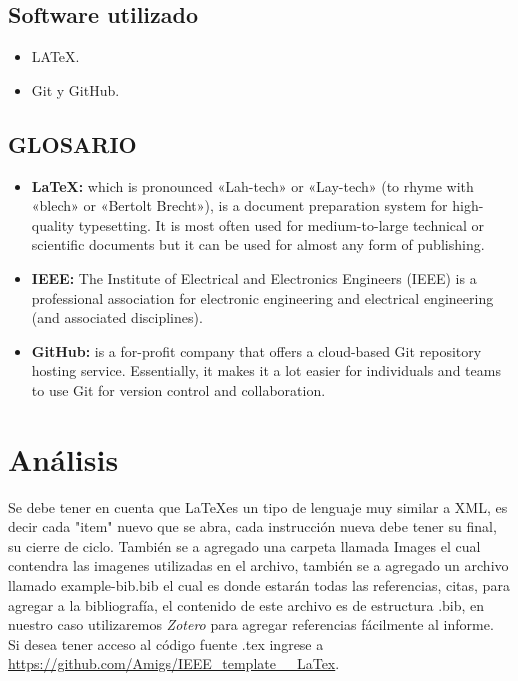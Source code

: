 \documentclass[journal, spanish]{IEEEtran}
\begin{document}
\subsection{\bf Software utilizado}
\begin{itemize}
    \item LATeX.
    \item Git y GitHub.
\end{itemize}
\subsection{\bf GLOSARIO}
\begin{itemize}
    \item {\bf LaTeX:} which is pronounced «Lah-tech» or «Lay-tech» (to rhyme with «blech» or «Bertolt Brecht»), is a document preparation system for high-quality typesetting. It is most often used for medium-to-large technical or scientific documents but it can be used for almost any form of publishing.\cite{noauthor_introduction_nodate}
    \item {\bf IEEE:} The Institute of Electrical and Electronics Engineers (IEEE) is a professional association for electronic engineering and electrical engineering (and associated disciplines).\cite{noauthor_institute_2021}
    \item {\bf GitHub:} is a for-profit company that offers a cloud-based Git repository hosting service. Essentially, it makes it a lot easier for individuals and teams to use Git for version control and collaboration.\cite{noauthor_what_nodate}
\end{itemize}
\section{Análisis}
Se debe tener en cuenta que \LaTeX es un tipo de lenguaje muy similar a XML, es decir cada "item" nuevo que se abra, cada instrucción nueva debe tener su final, su cierre de ciclo. También se a agregado una carpeta llamada Images el cual contendra las imagenes utilizadas en el archivo, también se a agregado un archivo llamado example-bib.bib el cual es donde estarán todas las referencias, citas, para agregar a la bibliografía, el contenido de este archivo es de estructura .bib, en nuestro caso utilizaremos \textit{Zotero} para agregar referencias fácilmente al informe.\\
Si desea tener acceso al código fuente .tex ingrese a \url{https://github.com/Amigs/IEEE_template__LaTex}.
\end{document}
